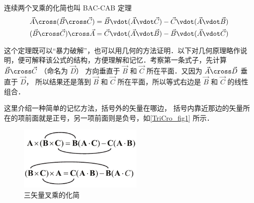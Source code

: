 

连续两个叉乘的化简也叫 BAC-CAB 定理
\begin{gather}
\vec A \cross (\vec B \cross \vec C) = \vec B \vdot (\vec A \vdot \vec C) - \vec C \vdot (\vec A \vdot \vec B)\\
(\vec B \cross \vec C) \cross \vec A = \vec C \vdot (\vec A \vdot \vec B) - \vec B \vdot (\vec A \vdot \vec C)
\end{gather}

这个定理既可以“暴力破解”，也可以用几何的方法证明．以下对几何原理略作说明，便可解释该公式的结构，方便理解和记忆．考察第一条式子，先计算 $\vec B \cross \vec C$ （命名为 $\vec D$） 方向垂直于 $\vec B$ 和 $\vec C$ 所在平面．又因为 $\vec A \cross \vec D$ 垂直于 $\vec D$， 所以结果还是落到 $\vec B$ 和 $\vec C$ 所在平面，所以等式右边是 $\vec B$ 和 $\vec C$ 的线性组合．

这里介绍一种简单的记忆方法，括号外的矢量在哪边， 括号内靠近那边的矢量所在的项前面就是正号，另一项前面则是负号，如\autoref{TriCro_fig1} 所示．

\begin{figure}[ht]
\centering
\includegraphics[width=6cm]{./figures/TriCro.pdf}
\caption{三矢量叉乘的化简}\label{TriCro_fig1}
\end{figure}
 
